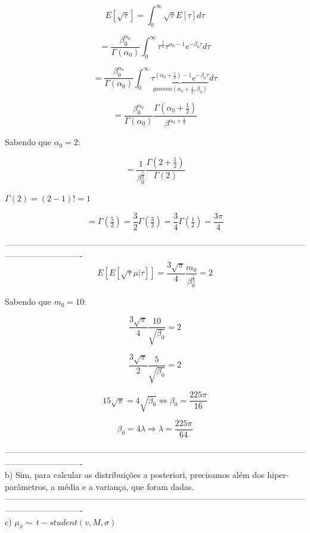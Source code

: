 \documentclass{article}
\begin{document}
		$$E[\sqrt{\tau}] = \int_{0}^{\infty} \sqrt{\tau} E[\tau] d\tau$$
		
		$$= \frac{\beta_0^{\alpha_0}}{\Gamma(\alpha_0)}  \int_{0}^{\infty} \tau^{\frac{1}{2}} \tau^{\alpha_0 - 1} e^{-\beta_0 \tau} d\tau$$
		
		$$= \frac{\beta_0^{\alpha_0}}{\Gamma(\alpha_0)}  \int_{0}^{\infty} \underbrace{\tau^{(\alpha_0 + \frac{1}{2}) - 1} e^{-\beta_0 \tau}}_{gamma(\alpha_0 + \frac{1}{2}, \beta_0)} d\tau$$
		
		$$= \frac{\beta_0^{\alpha_0}}{\Gamma(\alpha_0)} \frac{\Gamma(\alpha_0 + \frac{1}{2})}{\beta^{\alpha_0 + \frac{1}{2}}}$$
		
		Sabendo que $\alpha_0 = 2$:
		
		$$= \frac{1}{\beta_0^{\frac{1}{2}}} \frac{\Gamma(2 + \frac{1}{2})}{\Gamma(2)}$$
		
		$\Gamma(2) = (2-1)! = 1$
	
		$$= \Gamma(\tfrac{5}{2}) = \frac{3}{2} \Gamma(\tfrac{3}{2}) = \frac{3}{4} \Gamma(\tfrac{1}{2}) = \frac{3 \pi}{4}$$
		
		----------------------------------------------------------------------------------------------------------------------------------------\\
		
		$$E[E[\sqrt{\tau}\mu | \tau]] = \frac{3\sqrt{\pi}}{4} \frac{m_0}{\beta_0^{\frac{1}{2}}} = 2$$
		
		Sabendo que $m_0 = 10$:
		
		$$\frac{3 \sqrt{\pi}}{4} \frac{10}{\sqrt{\beta_0}} = 2$$
		
		$$\frac{3 \sqrt{\pi}}{2} \frac{5}{\sqrt{\beta_0}} = 2$$
		
		$$15 \sqrt{\pi} = 4\sqrt{\beta_0} \Leftrightarrow \beta_0 = \frac{225 \pi}{16}$$
		
		$$\beta_0 = 4 \lambda \Rightarrow \lambda = \frac{225 \pi}{64}$$
		
		----------------------------------------------------------------------------------------------------------------------------------------\\
		b) Sim, para calcular as distribuições a posteriori, precisamos além dos hiper-parâmetros, a média e a variança, que foram dadas.\\
		----------------------------------------------------------------------------------------------------------------------------------------\\
		c) $\mu_{\overline{x}} \sim\ t-student(v, M, \sigma)$\\
		
\end{document}
